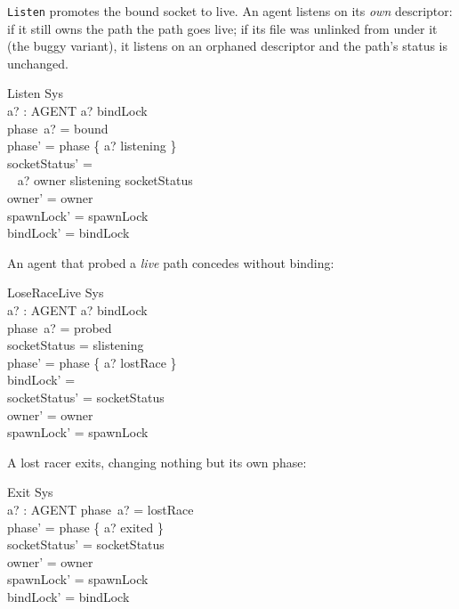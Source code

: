 \documentclass[a4paper,10pt,fleqn]{article}
\begin{document}
\texttt{Listen} promotes the bound socket to live.  An agent listens on
its \emph{own} descriptor: if it still owns the path the path goes live;
if its file was unlinked from under it (the buggy variant), it listens on
an orphaned descriptor and the path's status is unchanged.

\begin{schema}{Listen}
  \Delta Sys \\
  a? : AGENT
\where
  a? \in bindLock \\
  phase~a? = bound \\
  phase' = phase \oplus \{ a? \mapsto listening \} \\
  socketStatus' = \\
  \quad~ \IF a? \in owner \THEN slistening \ELSE socketStatus \\
  owner' = owner \\
  spawnLock' = spawnLock \\
  bindLock' = bindLock
\end{schema}

An agent that probed a \emph{live} path concedes without binding:

\begin{schema}{LoseRaceLive}
  \Delta Sys \\
  a? : AGENT
\where
  a? \in bindLock \\
  phase~a? = probed \\
  socketStatus = slistening \\
  phase' = phase \oplus \{ a? \mapsto lostRace \} \\
  bindLock' = \emptyset \\
  socketStatus' = socketStatus \\
  owner' = owner \\
  spawnLock' = spawnLock
\end{schema}

A lost racer exits, changing nothing but its own phase:

\begin{schema}{Exit}
  \Delta Sys \\
  a? : AGENT
\where
  phase~a? = lostRace \\
  phase' = phase \oplus \{ a? \mapsto exited \} \\
  socketStatus' = socketStatus \\
  owner' = owner \\
  spawnLock' = spawnLock \\
  bindLock' = bindLock
\end{schema}
\end{document}
